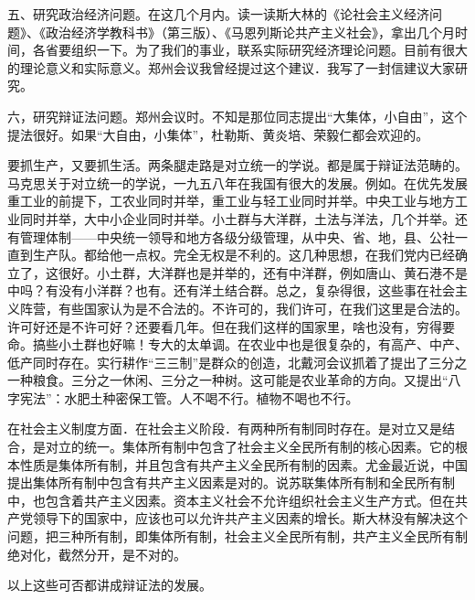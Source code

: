 五、研究政治经济问题。在这几个月内。读一读斯大林的《论社会主义经济问题》、《政治经济学教科书》（第三版）、《马恩列斯论共产主义社会》，拿出几个月时间，各省要组织一下。为了我们的事业，联系实际研究经济理论问题。目前有很大的理论意义和实际意义。郑州会议我曾经提过这个建议．我写了一封信建议大家研究。

六，研究辩证法问题。郑州会议时。不知是那位同志提出“大集体，小自由”，这个提法很好。如果“大自由，小集体”，杜勒斯、黄炎培、荣毅仁都会欢迎的。

要抓生产，又要抓生活。两条腿走路是对立统一的学说。都是属于辩证法范畴的。马克思关于对立统一的学说，一九五八年在我国有很大的发展。例如。在优先发展重工业的前提下，工农业同时并举，重工业与轻工业同时并举。中央工业与地方工业同时并举，大中小企业同时并举。小土群与大洋群，土法与洋法，几个并举。还有管理体制——中央统一领导和地方各级分级管理，从中央、省、地，县、公社一直到生产队。都给他一点权。完全无权是不利的。这几种思想，在我们党内已经确立了，这很好。小土群，大洋群也是并举的，还有中洋群，例如唐山、黄石港不是中吗？有没有小洋群？也有。还有洋土结合群。总之，复杂得很，这些事在社会主义阵营，有些国家认为是不合法的。不许可的，我们许可，在我们这里是合法的。许可好还是不许可好？还要看几年。但在我们这样的国家里，啥也没有，穷得要命。搞些小土群也好嘛！专大的太单调。在农业中也是很复杂的，有高产、中产、低产同时存在。实行耕作“三三制”是群众的创造，北戴河会议抓着了提出了三分之一种粮食。三分之一休闲、三分之一种树。这可能是农业革命的方向。又提出“八字宪法”：水肥土种密保工管。人不喝不行。植物不喝也不行。

在社会主义制度方面．在社会主义阶段．有两种所有制同时存在。是对立又是结合，是对立的统一。集体所有制中包含了社会主义全民所有制的核心因素。它的根本性质是集体所有制，并且包含有共产主义全民所有制的因素。尤金最近说，中国提出集体所有制中包含有共产主义因素是对的。说苏联集体所有制和全民所有制中，也包含着共产主义因素。资本主义社会不允许组织社会主义生产方式。但在共产党领导下的国家中，应该也可以允许共产主义因素的增长。斯大林没有解决这个问题，把三种所有制，即集体所有制，社会主义全民所有制，共产主义全民所有制绝对化，截然分开，是不对的。

以上这些可否都讲成辩证法的发展。

